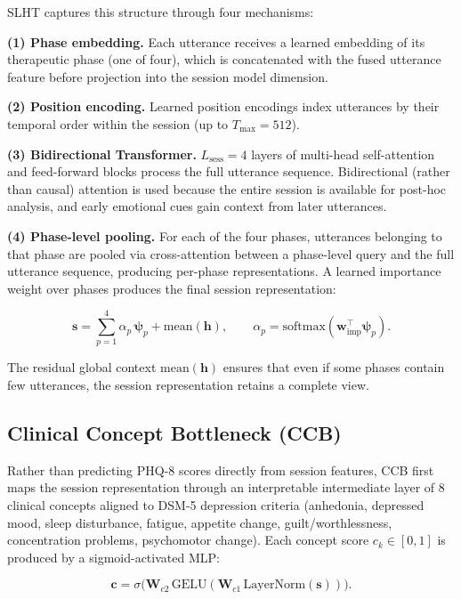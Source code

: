 \documentclass{article}
\begin{document}
SLHT captures this structure through four mechanisms:

\textbf{(1) Phase embedding.} Each utterance receives a learned embedding of its
therapeutic phase (one of four), which is concatenated with the fused utterance feature
before projection into the session model dimension.

\textbf{(2) Position encoding.} Learned position encodings index utterances by their
temporal order within the session (up to $T_{\max} = 512$).

\textbf{(3) Bidirectional Transformer.} $L_{\text{sess}} = 4$ layers of multi-head
self-attention and feed-forward blocks process the full utterance sequence. Bidirectional
(rather than causal) attention is used because the entire session is available for
post-hoc analysis, and early emotional cues gain context from later utterances.

\textbf{(4) Phase-level pooling.} For each of the four phases, utterances belonging to
that phase are pooled via cross-attention between a phase-level query and the full
utterance sequence, producing per-phase representations. A learned importance weight
over phases produces the final session representation:

\begin{equation}
  \mathbf{s} = \sum_{p=1}^{4} \alpha_p \, \mathbf{\psi}_p + \text{mean}(\mathbf{h}),
  \qquad
  \alpha_p = \text{softmax}(\mathbf{w}_{\text{imp}}^\top \mathbf{\psi}_p).
  \label{eq:session}
\end{equation}

The residual global context $\text{mean}(\mathbf{h})$ ensures that even if some phases
contain few utterances, the session representation retains a complete view.

\subsection{Clinical Concept Bottleneck (CCB)}

Rather than predicting PHQ-8 scores directly from session features, CCB first maps the
session representation through an interpretable intermediate layer of 8 clinical concepts
aligned to DSM-5 depression criteria (anhedonia, depressed mood, sleep disturbance,
fatigue, appetite change, guilt/worthlessness, concentration problems, psychomotor change).
Each concept score $c_k \in [0, 1]$ is produced by a sigmoid-activated MLP:

\begin{equation}
  \mathbf{c} = \sigma\big(\mathbf{W}_{c2}\,
               \text{GELU}(\mathbf{W}_{c1}\,
               \text{LayerNorm}(\mathbf{s}))\big).
  \label{eq:concept}
\end{equation}
\end{document}
